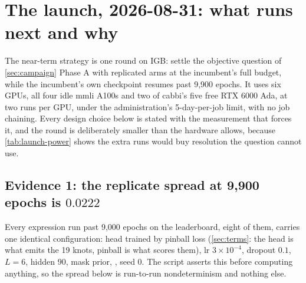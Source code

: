 
\section{The launch, 2026-08-31: what runs next and why}
\label{sec:launch}

The near-term strategy is one round on IGB: settle the objective question of
\cref{sec:campaign} Phase A with replicated arms at the incumbent's full budget, while the
incumbent's own checkpoint resumes past 9,900 epochs. It uses six GPUs, all four idle mmli
A100s and two of cabbi's five free RTX 6000 Ada, at two runs per GPU, under the
administration's 5-day-per-job limit, with no job chaining. Every design choice below is
stated with the measurement that forces it, and the round is deliberately smaller than the
hardware allows, because \cref{tab:launch-power} shows the extra runs would buy resolution
the question cannot use.

\subsection{Evidence 1: the replicate spread at 9,900 epochs is $0.0222$}

Every expression run past 9,000 epochs on the leaderboard, eight of them, carries one
identical configuration:  head trained by pinball loss (\cref{sec:terms}:
the head is what emits the 19 knots, pinball is what scores them), lr $3 \times 10^{-4}$,
dropout $0.1$, $L = 6$, hidden 90, mask prior, , seed 0. The script asserts
this before computing anything, so the spread below is run-to-run nondeterminism and
nothing else.

